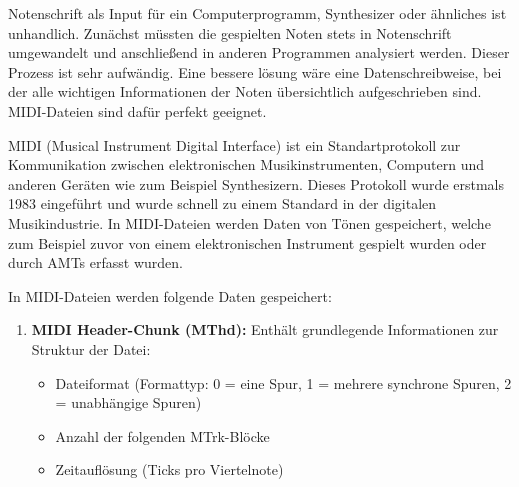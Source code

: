 \begin{description}[style=nextline]
\item[MIDI-Dateien]\label{itm:midi}
Notenschrift als Input für ein Computerprogramm, Synthesizer oder ähnliches ist unhandlich.
Zunächst müssten die gespielten Noten stets in Notenschrift umgewandelt und anschließend in anderen Programmen analysiert werden.
Dieser Prozess ist sehr aufwändig.
Eine bessere lösung wäre eine Datenschreibweise,
bei der alle wichtigen Informationen der Noten übersichtlich aufgeschrieben sind.
MIDI-Dateien sind dafür perfekt geeignet.

MIDI (Musical Instrument Digital Interface) ist ein Standartprotokoll zur Kommunikation zwischen
elektronischen Musikinstrumenten, Computern und anderen Geräten wie zum Beispiel Synthesizern.
Dieses Protokoll wurde erstmals 1983 eingeführt und wurde schnell zu einem Standard in der digitalen Musikindustrie\cite{smith1983midi}.
In MIDI-Dateien werden Daten von Tönen gespeichert,
welche zum Beispiel zuvor von einem elektronischen Instrument gespielt wurden oder durch AMTs erfasst wurden.

In MIDI-Dateien werden folgende Daten gespeichert:
\begin{enumerate}
    \item \textbf{MIDI Header-Chunk (MThd):} Enthält grundlegende Informationen zur Struktur der Datei:
    \begin{itemize}
        \item Dateiformat (Formattyp: 0 = eine Spur, 1 = mehrere synchrone Spuren, 2 = unabhängige Spuren)
        \item Anzahl der folgenden MTrk-Blöcke
        \item Zeitauflösung (Ticks pro Viertelnote)
    \end{itemize}


\end{enumerate}
\end{description}
